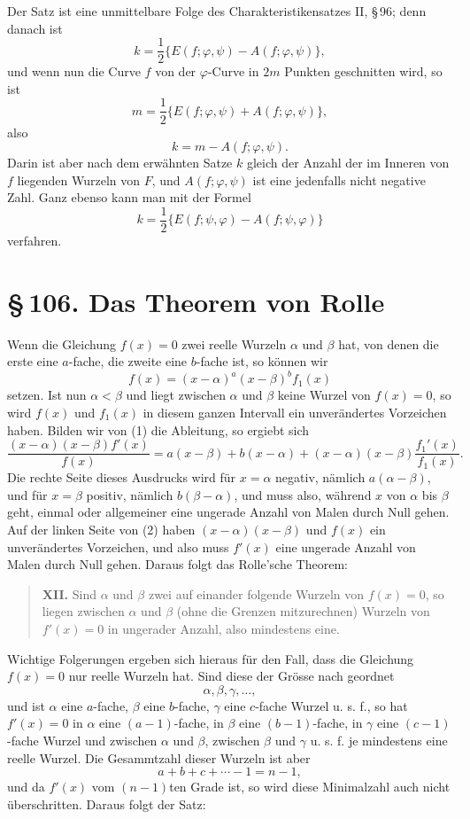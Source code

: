 \documentclass[11pt]{article}
\providecommand{\sect}[2]{\section*{\S\,#1. #2}}
\begin{document}
Der Satz ist eine unmittelbare Folge des Charakteristikensatzes II, \S\,96; denn danach ist
\[
        k=\frac12\{E(f;\varphi,\psi)-A(f;\varphi,\psi)\},
\]
und wenn nun die Curve $f$ von der $\varphi$-Curve in $2m$ Punkten geschnitten wird, so ist
\[
        m=\frac12\{E(f;\varphi,\psi)+A(f;\varphi,\psi)\},
\]
also
\[
        k=m-A(f;\varphi,\psi).
\]
Darin ist aber nach dem erwähnten Satze $k$ gleich der Anzahl der im Inneren von $f$ liegenden Wurzeln von $F$, und $A(f;\varphi,\psi)$ ist eine jedenfalls nicht negative Zahl. Ganz ebenso kann man mit der Formel
\[
        k=\frac12\{E(f;\psi,\varphi)-A(f;\psi,\varphi)\}
\]
verfahren.

\sect{106}{Das Theorem von Rolle}

Wenn die Gleichung $f(x)=0$ zwei reelle Wurzeln $\alpha$ und $\beta$ hat, von denen die erste eine $a$-fache, die zweite eine $b$-fache ist, so können wir
\begin{equation}
        f(x)=(x-\alpha)^a(x-\beta)^b f_1(x)
\tag{1}
\end{equation}
setzen. Ist nun $\alpha<\beta$ und liegt zwischen $\alpha$ und $\beta$ keine Wurzel von $f(x)=0$, so wird $f(x)$ und $f_1(x)$ in diesem ganzen Intervall ein unverändertes Vorzeichen haben. Bilden wir von (1) die Ableitung, so ergiebt sich
\begin{equation}
\frac{(x-\alpha)(x-\beta)f'(x)}{f(x)}
=a(x-\beta)+b(x-\alpha)+(x-\alpha)(x-\beta)\frac{f_1'(x)}{f_1(x)}.
\tag{2}
\end{equation}
Die rechte Seite dieses Ausdrucks wird für $x=\alpha$ negativ, nämlich $a(\alpha-\beta)$, und für $x=\beta$ positiv, nämlich $b(\beta-\alpha)$, und muss also, während $x$ von $\alpha$ bis $\beta$ geht, einmal oder allgemeiner eine ungerade Anzahl von Malen durch Null gehen. Auf der linken Seite von (2) haben $(x-\alpha)(x-\beta)$ und $f(x)$ ein unverändertes Vorzeichen, und also muss $f'(x)$ eine ungerade Anzahl von Malen durch Null gehen. Daraus folgt das Rolle'sche Theorem:

\begin{quote}
\textbf{XII.} Sind $\alpha$ und $\beta$ zwei auf einander folgende Wurzeln von $f(x)=0$, so liegen zwischen $\alpha$ und $\beta$ (ohne die Grenzen mitzurechnen) Wurzeln von $f'(x)=0$ in ungerader Anzahl, also mindestens eine.
\end{quote}

Wichtige Folgerungen ergeben sich hieraus für den Fall, dass die Gleichung $f(x)=0$ nur reelle Wurzeln hat. Sind diese der Grösse nach geordnet
\[
        \alpha,\beta,\gamma,\ldots,
\]
und ist $\alpha$ eine $a$-fache, $\beta$ eine $b$-fache, $\gamma$ eine $c$-fache Wurzel u. s. f., so hat $f'(x)=0$ in $\alpha$ eine $(a-1)$-fache, in $\beta$ eine $(b-1)$-fache, in $\gamma$ eine $(c-1)$-fache Wurzel und zwischen $\alpha$ und $\beta$, zwischen $\beta$ und $\gamma$ u. s. f. je mindestens eine reelle Wurzel. Die Gesammtzahl dieser Wurzeln ist aber
\[
        a+b+c+\cdots-1=n-1,
\]
und da $f'(x)$ vom $(n-1)$ten Grade ist, so wird diese Minimalzahl auch nicht überschritten. Daraus folgt der Satz:
\end{document}
